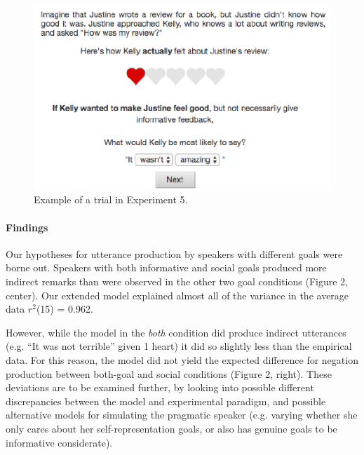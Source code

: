\begin{CodeChunk}
\captionsetup{width=0.8\textwidth}
\begin{figure}[h]
{\centering \includegraphics{figures/expt_screen-1} 

}

\caption[Example of a trial in Experiment 1]{Example of a trial in Experiment 5.}\label{fig:expt2_screen}
\end{figure}
\end{CodeChunk}




\paragraph{Findings}

Our hypotheses for utterance production by speakers with different goals
were borne out. Speakers with both
informative and social goals produced more indirect remarks than were
observed in the other two goal conditions (Figure 2, center). 
Our extended model explained almost all of the variance in the
average data \(r^2\)(15) = 0.962. 

However, while the model in the \emph{both} condition did produce indirect
utterances (e.g. ``It was not terrible'' given 1 heart) it did so
slightly less than the empirical data. For this reason, the model did
not yield the expected difference for negation production between
both-goal and social conditions (Figure 2, right). 
These deviations are to be examined further,
by looking into possible different discrepancies between the model and experimental paradigm, 
and possible alternative models for simulating the pragmatic speaker 
(e.g. varying whether she only cares about her self-representation goals, 
or also has genuine goals to be informative considerate).

